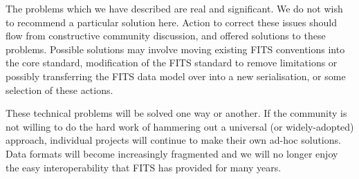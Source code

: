 \documentclass[11pt,twoside]{article}
\begin{document}
The problems which we have described are real and significant. We
do not wish to recommend a particular solution here. Action to correct
these issues should flow from constructive community discussion, and
offered solutions to these problems. Possible solutions may involve
moving existing FITS conventions into the core standard,
modification of the FITS standard to remove limitations or possibly
transferring the FITS data model over into a new serialisation, or
some selection of these actions.

These technical problems will be solved one way or another. If the
community is not willing to do the hard work of hammering out a
universal (or widely-adopted) approach, individual projects will
continue to make their own ad-hoc solutions. Data formats will become
increasingly fragmented and we will no longer enjoy the easy
interoperability that FITS has provided for many years.



\end{document}
